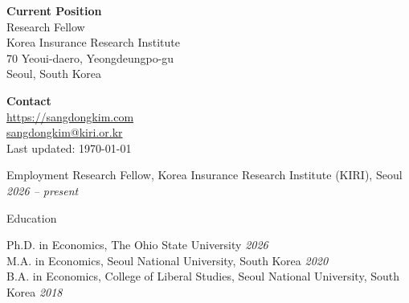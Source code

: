 \documentclass{cv} %
\begin{document}
\begin{minipage}{0.49\textwidth}
	\begin{flushleft}
		\textbf{Current Position} \\
		Research Fellow \\
		Korea Insurance Research Institute \\
		70 Yeoui-daero, Yeongdeungpo-gu \\
		Seoul, South Korea
	\end{flushleft}
\end{minipage}
\begin{minipage}{0.49\textwidth}
	\begin{flushright}
		\textbf{Contact} \\
		\href{https://sangdongkim.com}{https://sangdongkim.com}\\
		\href{mailto:sangdongkim@kiri.or.kr}{sangdongkim@kiri.or.kr} \\
		Last updated: \today
		\\
	\end{flushright}
\end{minipage}
\bigskip

\begin{rSection}{Employment}
{Research Fellow, Korea Insurance Research Institute (KIRI), Seoul} \hfill {\em 2026 -- present}
\end{rSection}
\bigskip

\begin{rSection}{Education}

{Ph.D. in Economics, The Ohio State University} \hfill {\em 2026} \\
{M.A. in Economics, Seoul National University, South Korea} \hfill {\em 2020} \\
{B.A. in Economics, College of Liberal Studies, Seoul National University, South Korea} \hfill {\em 2018}
\end{rSection}
\bigskip
\end{document}

